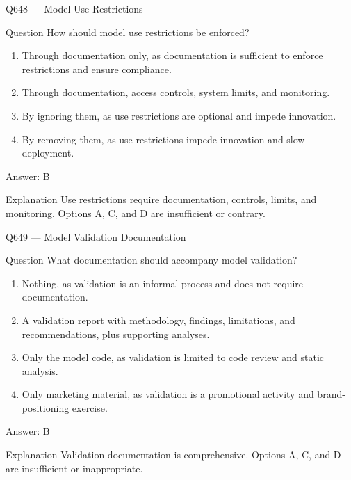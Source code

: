 \documentclass[aspectratio=169,8pt]{beamer}
\begin{document}
	\begin{frame}{Q648 --- Model Use Restrictions}
		\begin{block}{Question}
			How should model use restrictions be enforced?
			\begin{enumerate}
				\item Through documentation only, as documentation is sufficient to enforce restrictions and ensure compliance.
				\item Through documentation, access controls, system limits, and monitoring.
				\item By ignoring them, as use restrictions are optional and impede innovation.
				\item By removing them, as use restrictions impede innovation and slow deployment.
			\end{enumerate}
		\end{block}
		\begin{exampleblock}{Answer: B}\end{exampleblock}
		\begin{block}{Explanation}
			Use restrictions require documentation, controls, limits, and monitoring. Options A, C, and D are insufficient or contrary.
		\end{block}
	\end{frame}
	
	\begin{frame}{Q649 --- Model Validation Documentation}
		\begin{block}{Question}
			What documentation should accompany model validation?
			\begin{enumerate}
				\item Nothing, as validation is an informal process and does not require documentation.
				\item A validation report with methodology, findings, limitations, and recommendations, plus supporting analyses.
				\item Only the model code, as validation is limited to code review and static analysis.
				\item Only marketing material, as validation is a promotional activity and brand-positioning exercise.
			\end{enumerate}
		\end{block}
		\begin{exampleblock}{Answer: B}\end{exampleblock}
		\begin{block}{Explanation}
			Validation documentation is comprehensive. Options A, C, and D are insufficient or inappropriate.
		\end{block}
	\end{frame}
	
\end{document}
